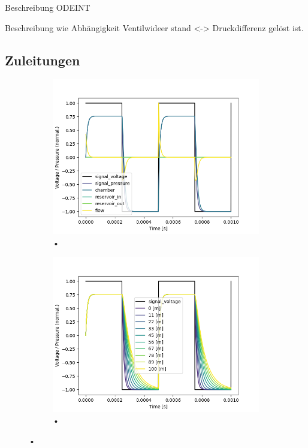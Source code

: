 \documentclass[fontsize=12pt, a4paper]{scrartcl}
\begin{document}
Beschreibung ODEINT

Beschreibung wie Abhängigkeit Ventilwideer stand <-> Druckdifferenz gelöst ist.

\subsection{Zuleitungen}

\begin{figure}[H]
	\centering
	\begin{subfigure}[H]{0.48\textwidth}
		\includegraphics[width=\textwidth, valign=t]{bilder/tubelength/tl_in_branch_singlesweep.png}
		\caption{•}
	\end{subfigure}
	\begin{subfigure}[H]{0.48\textwidth}
		\includegraphics[width=\textwidth, valign=t]{bilder/tubelength/tl_in_branch_multisweep.png}
		\caption{•}
	\end{subfigure}
	\caption{•}
\end{figure}
\end{document}
